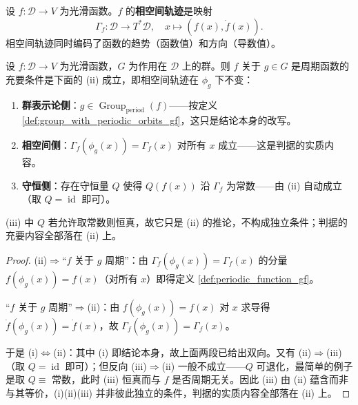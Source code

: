 \begin{definition}[函数的相空间轨迹]\label{def:function_phase_trajectory}
设 $f: \mathcal{D} \to V$ 为光滑函数。$f$ 的\textbf{相空间轨迹}是映射
\[
\Gamma_f: \mathcal{D} \to T^*\mathcal{D}, \quad x \mapsto (f(x), \dot{f}(x)).
\]
相空间轨迹同时编码了函数的趋势（函数值）和方向（导数值）。
\end{definition}

\begin{theorem}\label{thm:phase_group_joint_criterion}
设 $f: \mathcal{D} \to V$ 为光滑函数，$G$ 为作用在 $\mathcal{D}$ 上的群。则 $f$ 关于 $g \in G$ 是周期函数的充要条件是下面的 (ii) 成立，即相空间轨迹在 $\phi_g$ 下不变：
\begin{enumerate}[label=(\roman*)]
    \item \textbf{群表示论侧}：$g \in \operatorname{Group}_{\mathrm{period}}(f)$——按定义 \ref{def:group_with_periodic_orbits_gf}，这只是结论本身的改写。
    \item \textbf{相空间侧}：$\Gamma_f(\phi_g(x)) = \Gamma_f(x)$ 对所有 $x$ 成立——这是判据的实质内容。
    \item \textbf{守恒侧}：存在守恒量 $Q$ 使得 $Q(f(x))$ 沿 $\Gamma_f$ 为常数——由 (ii) 自动成立（取 $Q=\operatorname{id}$ 即可）。
\end{enumerate}
(iii) 中 $Q$ 若允许取常数则恒真，故它只是 (ii) 的推论，不构成独立条件；判据的充要内容全部落在 (ii) 上。
\end{theorem}

\begin{proof}
(ii)$\Rightarrow$“$f$ 关于 $g$ 周期”：由 $\Gamma_f(\phi_g(x)) = \Gamma_f(x)$ 的分量 $f(\phi_g(x)) = f(x)$（对所有 $x$）即得定义 \ref{def:periodic_function_gf}。

“$f$ 关于 $g$ 周期”$\Rightarrow$(ii)：由 $f(\phi_g(x)) = f(x)$ 对 $x$ 求导得 $\dot{f}(\phi_g(x)) = \dot{f}(x)$，故 $\Gamma_f(\phi_g(x)) = \Gamma_f(x)$。

于是 (i)$\Leftrightarrow$(ii)：其中 (i) 即结论本身，故上面两段已给出双向。又有 (ii)$\Rightarrow$(iii)（取 $Q=\operatorname{id}$ 即可）；但反向 (iii)$\Rightarrow$(ii) 一般不成立——$Q$ 可退化，最简单的例子是取 $Q\equiv$ 常数，此时 (iii) 恒真而与 $f$ 是否周期无关。因此 (iii) 由 (ii) 蕴含而非与其等价，(i)(ii)(iii) 并非彼此独立的条件，判据的实质内容全部落在 (ii) 上。
\end{proof}

